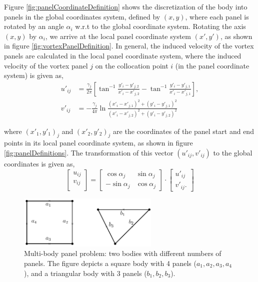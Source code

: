 Figure \ref{fig:panelCoordinateDefinition} shows the discretization of the body into panels in the global coordinates system, defined by $(x,y)$, where each panel is rotated by an angle $\alpha_i$ w.r.t to the global coordinate system. Rotating the axis $(x,y)$ by $\alpha_i$, we arrive at the local panel coordinate system $(x',y')$, as shown in figure \ref{fig:vortexPanelDefinition}. In general, the induced velocity of the vortex panels are calculated in the local panel coordinate system, where the induced velocity of the vortex panel $j$ on the collocation point $i$ (in the panel coordinate system) is given as,
	\begin{subequations}
	\begin{align}
	u'_{ij} &= \frac{\gamma_j}{2\pi}\left[\tan^{-1}\frac{y'_i-y'_{j,2}}{x'_i-x'_{j,2}} - \tan^{-1}\frac{y'_i-y'_{j,1}}{x'_i -x'_{j,1}}\right],\\
	v'_{ij} &= -\frac{\gamma_j}{4\pi}\ln\frac{\left(x'_i-x'_{j,1}\right)^2 + \left(y'_i-y'_{j,1}\right)^2}{\left(x'_i-x'_{j,2}\right)^2+\left(y'_i-y'_{j,2}\right)^2}
	\end{align}
	\end{subequations}

where $(x'_1,y'_1)_j$ and $(x'_2,y'_2)_j$ are the coordinates of the panel start and end points in its local panel coordinate system, as shown in figure \ref{fig:panelDefinitions}. The transformation of this vector $(u'_{ij}, v'_{ij})$ to the global coordinates is given as,
	\begin{equation}
	\begin{bmatrix}
	u_{ij}\\
	v_{ij}\\
	\end{bmatrix} = \begin{bmatrix}
	\cos\alpha_j & \sin\alpha_j \\
	-\sin\alpha_j & \cos\alpha_j
	\end{bmatrix} \cdot \begin{bmatrix}
	u'_{ij}\\
	v'_{ij}.
	\end{bmatrix}
	\end{equation}

	\begin{figure}[t]
	\centering
	\includegraphics[width=0.6\textwidth]{figures/lagrangian/twoPanelBodies.pdf}
	\caption{Multi-body panel problem: two bodies with different numbers of panels. The figure depicts a square body with 4 panels ($a_1, a_2, a_3, a_4$), and a triangular body with 3 panels ($b_1, b_2, b_3$). }
	\label{fig:twoPanelBodies}
	\end{figure}

